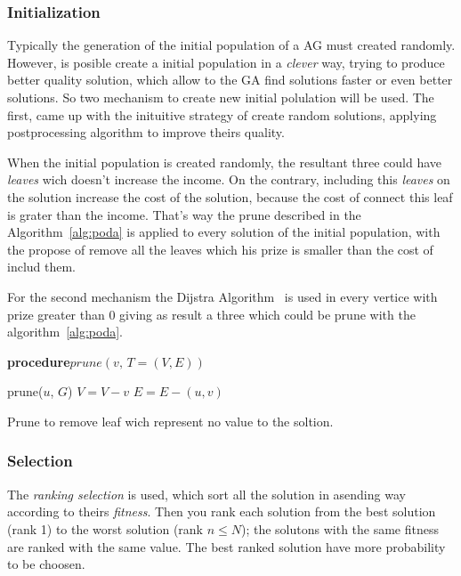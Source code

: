 \documentclass[10pt, conference, compsocconf]{IEEEtran}
\begin{document}
\subsubsection{Initialization}
\label{sec:init}
Typically the generation of the initial population of a AG must created randomly. However, is posible create a initial population in a {\em clever} way, trying to produce better quality solution, which allow to the GA find solutions faster or even better solutions. So two mechanism to create new initial polulation will be used. The first, came up with the inituitive strategy of create random solutions, applying postprocessing algorithm to improve theirs quality. 

When the initial population is created randomly, the resultant three could have {\em leaves} wich doesn't increase the income. On the contrary, including this {\em leaves} on the solution increase the cost of the solution, because the cost of connect this leaf is grater than the income. That's way the prune described in the Algorithm~\ref{alg:poda} is applied to every solution of the initial population, with the propose of remove all the leaves which his prize is smaller than the cost of includ them. 

For the second mechanism the Dijstra Algorithm~\cite{2215313} is used in every vertice with prize greater than 0 giving as result a three which could be prune with the algorithm~\ref{alg:poda}.


\begin{algorithm}
{\bf procedure}$prune(v, \, T = (V,E))$
  \begin{algorithmic}
\STATE prune($u$, $G$)
\STATE $V = V  - v$
\STATE $E = E - (u,v)$
\ENDIF
\ENDFOR
\end{algorithmic}
\caption{Prune to remove leaf wich represent no value to the soltion.}
  \label{alg:poda}
\end{algorithm}

\subsubsection{Selection}
The {\em ranking selection} is used, which sort all the solution in asending way according to theirs {\em fitness}. Then you rank each solution from the best solution (rank 1) to the worst solution (rank $n \leq N$); the solutons with the same fitness are ranked with the same value. The best ranked solution have more probability to be choosen.
\end{document}
